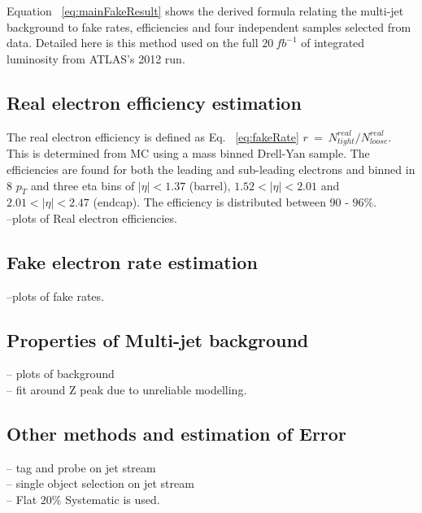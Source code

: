 Equation ~\ref{eq:mainFakeResult} shows the derived formula relating the multi-jet background to fake rates, efficiencies and four independent samples selected from data. Detailed here is this method used on the full $20~fb^{-1}$ of integrated luminosity from ATLAS's 2012 run.


\subsection{Real electron efficiency estimation}

The real electron efficiency is defined as Eq. ~\ref{eq:fakeRate} $r~=~N^{real}_{tight}/N^{real}_{loose}$. This is determined from MC using a mass binned Drell-Yan sample. The efficiencies are found for both the leading and sub-leading electrons and binned in 8 $p_{T}$ and three eta bins of $|\eta|<1.37$ (barrel), $1.52<|\eta|<2.01$ and $2.01<|\eta|<2.47$ (endcap). The efficiency is distributed between $90$ - $96\%$.\\

--plots of Real electron efficiencies.


\subsection{Fake electron rate estimation}



--plots of fake rates.

\subsection{Properties of Multi-jet background}

-- plots of background\\

-- fit around Z peak due to unreliable modelling.\\

\subsection{Other methods and estimation of Error}

-- tag and probe on jet stream\\

-- single object selection on jet stream\\

-- Flat $20\%$ Systematic is used.\\










